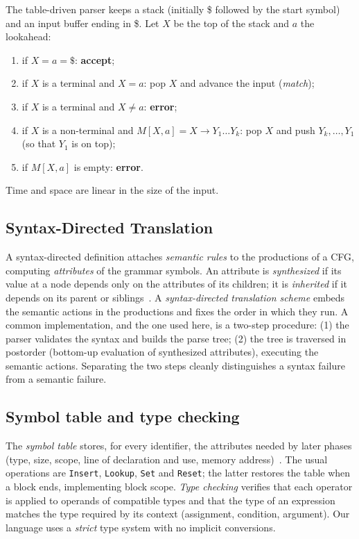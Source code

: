 \documentclass[11pt,a4paper]{article}
\begin{document}
The table-driven parser keeps a stack (initially \$ followed by the start symbol) and an input buffer ending in \$. Let $X$ be the top of the stack and $a$ the lookahead:
\begin{enumerate}[noitemsep]
  \item if $X=a=\$$: \textbf{accept};
  \item if $X$ is a terminal and $X=a$: pop $X$ and advance the input (\emph{match});
  \item if $X$ is a terminal and $X\neq a$: \textbf{error};
  \item if $X$ is a non-terminal and $M[X,a]=X\to Y_1\ldots Y_k$: pop $X$ and push $Y_k,\ldots,Y_1$ (so that $Y_1$ is on top);
  \item if $M[X,a]$ is empty: \textbf{error}.
\end{enumerate}
Time and space are linear in the size of the input.

\subsection{Syntax-Directed Translation}
A syntax-directed definition attaches \emph{semantic rules} to the productions of a CFG, computing \emph{attributes} of the grammar symbols. An attribute is \emph{synthesized} if its value at a node depends only on the attributes of its children; it is \emph{inherited} if it depends on its parent or siblings~\cite{knuth-semantics,aho}. A \emph{syntax-directed translation scheme} embeds the semantic actions in the productions and fixes the order in which they run. A common implementation, and the one used here, is a two-step procedure: (1) the parser validates the syntax and builds the parse tree; (2) the tree is traversed in postorder (bottom-up evaluation of synthesized attributes), executing the semantic actions. Separating the two steps cleanly distinguishes a syntax failure from a semantic failure.

\subsection{Symbol table and type checking}
The \emph{symbol table} stores, for every identifier, the attributes needed by later phases (type, size, scope, line of declaration and use, memory address)~\cite{aho,cooper}. The usual operations are \texttt{Insert}, \texttt{Lookup}, \texttt{Set} and \texttt{Reset}; the latter restores the table when a block ends, implementing block scope. \emph{Type checking} verifies that each operator is applied to operands of compatible types and that the type of an expression matches the type required by its context (assignment, condition, argument). Our language uses a \emph{strict} type system with no implicit conversions.
\end{document}
